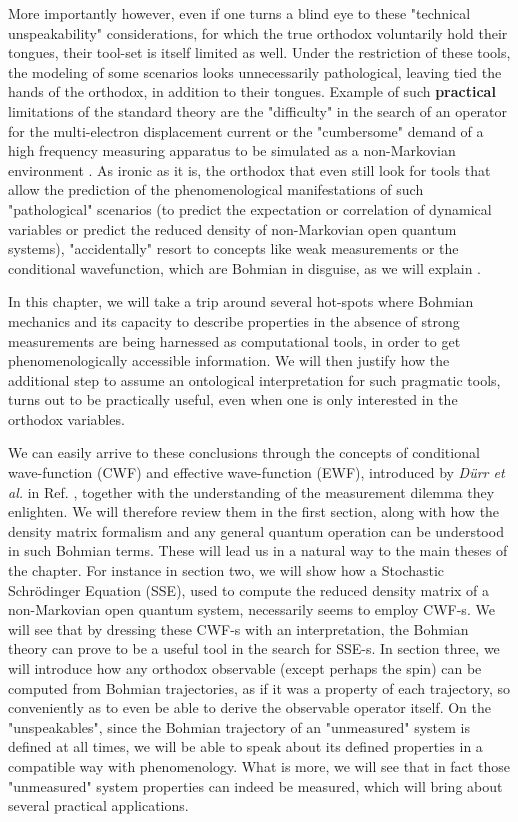 \documentclass[11pt, a4paper]{article} %
\begin{document}
More importantly however, even if one turns a blind eye to these "technical unspeakability" considerations, for which the true orthodox voluntarily hold their tongues, their tool-set is itself limited as well. Under the restriction of these tools, the modeling of some scenarios looks unnecessarily pathological, leaving tied the hands of the orthodox, in addition to their tongues. Example of such {\bf practical} limitations of the standard theory are the "difficulty" in the search of an operator for the multi-electron displacement current \cite{equiv, Pel} or the "cumbersome" demand of a high frequency measuring apparatus to be simulated as a non-Markovian environment \cite{Thz}. As ironic as it is, the orthodox that even still look for tools that allow the prediction of the phenomenological manifestations of such "pathological" scenarios (to predict the expectation or correlation of dynamical variables or predict the reduced density of non-Markovian open quantum systems), "accidentally" resort to concepts like weak measurements or the conditional wavefunction, which are Bohmian in disguise, as we will explain \cite{interpretSSE,NMisModal}.\vspace{-0.1cm}

In this chapter, we will take a trip around several hot-spots where Bohmian mechanics and its capacity to describe properties in the absence of strong measurements are being harnessed as computational tools, in order to get phenomenologically accessible information. We will then justify how the additional step to assume an ontological interpretation for such pragmatic tools, turns out to be practically useful, even when one is only interested in the orthodox variables.


We can easily arrive to these conclusions through the concepts of conditional wave-function (CWF) and effective wave-function (EWF), introduced by {\em Dürr et al.} in Ref. \cite{Absolute}, together with the understanding of the measurement dilemma they enlighten. We will therefore review them in the first section, along with how the density matrix formalism and any general quantum operation can be understood in such Bohmian terms. These will lead us in a natural way to the main theses of the chapter. For instance in section two, we will show how a Stochastic Schrödinger Equation (SSE), used to compute the reduced density matrix of a non-Markovian open quantum system, necessarily seems to employ CWF-s. We will see that by dressing these CWF-s with an interpretation, the Bohmian theory can prove to be a useful tool in the search for SSE-s. In section three, we will introduce how any orthodox observable (except perhaps the spin) can be computed from Bohmian trajectories, as if it was a property of each trajectory, so conveniently as to even be able to derive the observable operator itself. On the "unspeakables", since the Bohmian trajectory of an "unmeasured" system is defined at all times, we will be able to speak about its defined properties in a compatible way with phenomenology. What is more, we will see that in fact those "unmeasured" system properties can indeed be measured, which will bring about several practical applications.
\end{document}
